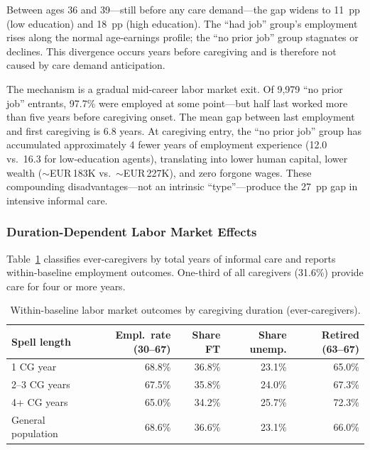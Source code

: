 Between ages 36 and 39---still before any care demand---the gap widens to 11~pp (low education) and 18~pp (high education). The ``had job'' group's employment rises along the normal age-earnings profile; the ``no prior job'' group stagnates or declines. This divergence occurs years before caregiving and is therefore not caused by care demand anticipation.

The mechanism is a gradual mid-career labor market exit. Of 9,979 ``no prior job'' entrants, 97.7\% were employed at some point---but half last worked more than five years before caregiving onset. The mean gap between last employment and first caregiving is 6.8 years. At caregiving entry, the ``no prior job'' group has accumulated approximately 4 fewer years of employment experience (12.0 vs.\ 16.3 for low-education agents), translating into lower human capital, lower wealth ($\sim$EUR\,183K vs.\ $\sim$EUR\,227K), and zero forgone wages. These compounding disadvantages---not an intrinsic ``type''---produce the 27~pp gap in intensive informal care.

\subsubsection{Duration-Dependent Labor Market Effects}

Table~\ref{tab:duration_baseline} classifies ever-caregivers by total years of informal care and reports within-baseline employment outcomes. One-third of all caregivers (31.6\%) provide care for four or more years.

\begin{table}[htbp]
  \centering
  \caption{Within-baseline labor market outcomes by caregiving duration (ever-caregivers).}
  \label{tab:duration_baseline}
  \small
  \begin{tabular}{lrrrr}
    \toprule
    Spell length & Empl.\ rate (30--67) & Share FT & Share unemp. & Retired (63--67) \\
    \midrule
    1 CG year & 68.8\% & 36.8\% & 23.1\% & 65.0\% \\
    2--3 CG years & 67.5\% & 35.8\% & 24.0\% & 67.3\% \\
    4+ CG years & 65.0\% & 34.2\% & 25.7\% & 72.3\% \\
    \addlinespace
    General population & 68.6\% & 36.6\% & 23.1\% & 66.0\% \\
    \bottomrule
  \end{tabular}
\end{table}

